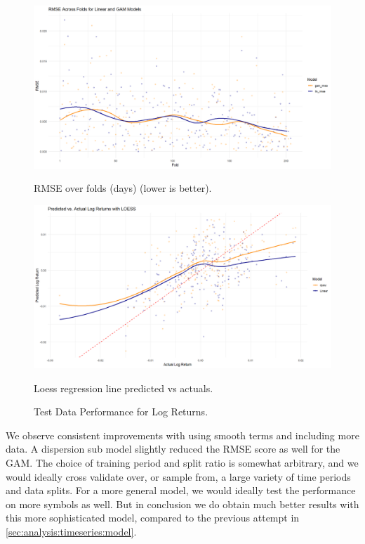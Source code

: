 \documentclass[12pt, twoside,hidelinks]{article}
\theoremstyle{definition}
\numberwithin{equation}{section}
\begin{document}
\begin{figure}[H]
    \centering
    \includegraphics[width=\linewidth]{visuals/log_return/rmse_folds_lr2.png}
    \caption*{RMSE over folds (days) (lower is better).}
    \label{log_return_alt_rmse_folds}

    \includegraphics[width=\linewidth]{visuals/log_return/lr2_loess_bige_and_wide.png}
    \caption*{Loess regression line predicted vs actuals.}
    \label{log_return_alt_loess}

    \caption{Test Data Performance for Log Returns.}
    \label{results:log_return_alt}
\end{figure}

We observe consistent improvements with using smooth terms and including more data. A dispersion sub model slightly reduced the RMSE score as well for the GAM. The choice of training period and split ratio is somewhat arbitrary, and we would ideally cross validate over, or sample from, a large variety of time periods and data splits. For a more general model, we would ideally test the performance on more symbols as well. But in conclusion we do obtain much better results with this more sophisticated model, compared to the previous attempt in \ref{sec:analysis:timeseries:model}.
\end{document}
